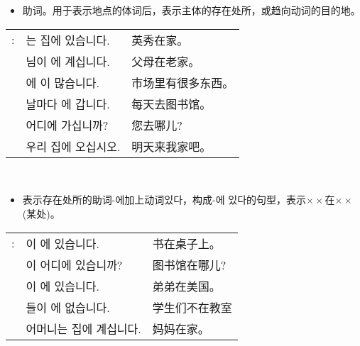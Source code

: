 \section{\kr{}}
\begin{grammar}
    \begin{grammarsect}[\kr -에]
        \begin{itemize}
            \item 助词。用于表示地点的体词后，表示主体的存在处所，或趋向动词的目的地。
        \end{itemize}
        \begin{tabular}{lll}
            \kr\ruby{例}{예}:& \kr\ruby{英秀}{영수}는 집에 있습니다.&英秀在家。\\
            &\kr\ruby{父母}{부모}님이 \ruby{故鄉}{고향}에 계십니다.&父母在老家。\\
            &\kr\ruby{市場}{시장}에 \ruby{物件}{물건}이 많습니다.&市场里有很多东西。\\
            &\kr 날마다 \ruby{圖書館}{도서관}에 갑니다.&每天去图书馆。\\
            &\kr 어디에 가십니까?&您去哪儿?\\
            &\kr\ruby{來日}{내일} 우리 집에 오십시오.&明天来我家吧。
        \end{tabular}\\
        \begin{itemize}
            \item 表示存在处所的助词{\kr-에}加上动词{\kr 있다}，构成{\kr -에 있다}的句型，表示$\times \times$在$\times \times$ (某处)。
        \end{itemize}
        \begin{tabular}{lll}
            \kr \ruby{例}{예}:&\kr \ruby{冊}{책}이 \ruby{冊床}{책상}에 있습니다.&书在桌子上。\\ 
            &\kr \ruby{圖書館}{도서관}이 어디에 있습니까?&图书馆在哪儿?\\
            &\kr \ruby{同生}{동생}이 \ruby{美國}{미국}에 있습니다.&弟弟在美国。\\
            &\kr \ruby{學生}{학생}들이 \ruby{教室}{교실}에 없습니다.&学生们不在教室\\
            &\kr 어머니는 집에 계십니다.&妈妈在家。\\
        \end{tabular}\\
    \end{grammarsect}
\end{grammar}